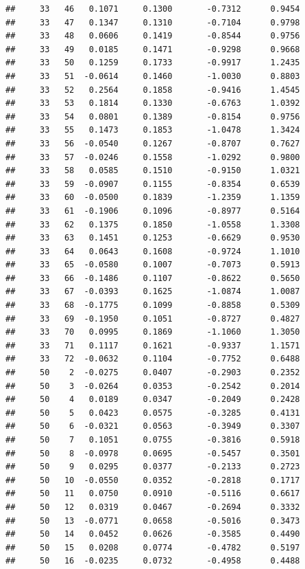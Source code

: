 \documentclass[
]{article}
\begin{document}
\begin{verbatim}
##     33   46   0.1071     0.1300       -0.7312      0.9454 
##     33   47   0.1347     0.1310       -0.7104      0.9798 
##     33   48   0.0606     0.1419       -0.8544      0.9756 
##     33   49   0.0185     0.1471       -0.9298      0.9668 
##     33   50   0.1259     0.1733       -0.9917      1.2435 
##     33   51  -0.0614     0.1460       -1.0030      0.8803 
##     33   52   0.2564     0.1858       -0.9416      1.4545 
##     33   53   0.1814     0.1330       -0.6763      1.0392 
##     33   54   0.0801     0.1389       -0.8154      0.9756 
##     33   55   0.1473     0.1853       -1.0478      1.3424 
##     33   56  -0.0540     0.1267       -0.8707      0.7627 
##     33   57  -0.0246     0.1558       -1.0292      0.9800 
##     33   58   0.0585     0.1510       -0.9150      1.0321 
##     33   59  -0.0907     0.1155       -0.8354      0.6539 
##     33   60  -0.0500     0.1839       -1.2359      1.1359 
##     33   61  -0.1906     0.1096       -0.8977      0.5164 
##     33   62   0.1375     0.1850       -1.0558      1.3308 
##     33   63   0.1451     0.1253       -0.6629      0.9530 
##     33   64   0.0643     0.1608       -0.9724      1.1010 
##     33   65  -0.0580     0.1007       -0.7073      0.5913 
##     33   66  -0.1486     0.1107       -0.8622      0.5650 
##     33   67  -0.0393     0.1625       -1.0874      1.0087 
##     33   68  -0.1775     0.1099       -0.8858      0.5309 
##     33   69  -0.1950     0.1051       -0.8727      0.4827 
##     33   70   0.0995     0.1869       -1.1060      1.3050 
##     33   71   0.1117     0.1621       -0.9337      1.1571 
##     33   72  -0.0632     0.1104       -0.7752      0.6488 
##     50    2  -0.0275     0.0407       -0.2903      0.2352 
##     50    3  -0.0264     0.0353       -0.2542      0.2014 
##     50    4   0.0189     0.0347       -0.2049      0.2428 
##     50    5   0.0423     0.0575       -0.3285      0.4131 
##     50    6  -0.0321     0.0563       -0.3949      0.3307 
##     50    7   0.1051     0.0755       -0.3816      0.5918 
##     50    8  -0.0978     0.0695       -0.5457      0.3501 
##     50    9   0.0295     0.0377       -0.2133      0.2723 
##     50   10  -0.0550     0.0352       -0.2818      0.1717 
##     50   11   0.0750     0.0910       -0.5116      0.6617 
##     50   12   0.0319     0.0467       -0.2694      0.3332 
##     50   13  -0.0771     0.0658       -0.5016      0.3473 
##     50   14   0.0452     0.0626       -0.3585      0.4490 
##     50   15   0.0208     0.0774       -0.4782      0.5197 
##     50   16  -0.0235     0.0732       -0.4958      0.4488 

\end{verbatim}
\end{document}
